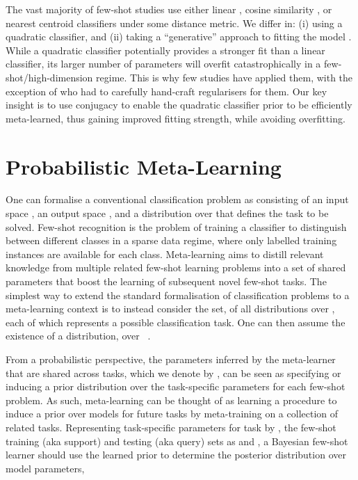 \documentclass[10pt,twocolumn,letterpaper]{article}
\begin{document}
 The vast majority of few-shot studies use either linear \cite{mangla2020charting,gordon2019metaPred,dvornik2020selecting}, cosine similarity \cite{qiao2017few}, or nearest centroid classifiers \cite{wang2019simpleshot,snell2017prototypical} under some distance metric. We differ in: (i) using a quadratic classifier, and (ii) taking a ``generative'' approach to fitting the model \cite{hastie2009elements}. While a quadratic classifier potentially provides a stronger fit than a linear classifier, its larger number of parameters will overfit catastrophically in a few-shot/high-dimension regime. This is why few studies have applied them, with the exception of \cite{bateni2020improved} who had to carefully hand-craft regularisers for them. Our key insight is to use conjugacy to enable the quadratic classifier prior to be efficiently meta-learned, thus gaining improved fitting strength, while avoiding overfitting.

\section{Probabilistic Meta-Learning}
\label{sec:probabilistic-meta-learning}
One can formalise a conventional classification problem as consisting of an input space , an output space , and a distribution  over  that defines the task to be solved. Few-shot recognition is the problem of training a classifier to distinguish between  different classes in a sparse data regime, where only  labelled training instances are available for each class. Meta-learning aims to distill relevant knowledge from multiple related few-shot learning problems into a set of shared parameters that boost the learning of subsequent novel few-shot tasks. The simplest way to extend the standard formalisation of classification problems to a meta-learning context is to instead consider the set,  of all distributions over , each of which represents a possible classification task. One can then assume the existence of a distribution,  over ~\cite{baxter2000model}.

From a probabilistic perspective, the parameters inferred by the meta-learner that are shared across tasks, which we denote by , can be seen as specifying or inducing a prior distribution over the task-specific parameters for each few-shot problem. As such, meta-learning can be thought of as learning a procedure to induce a prior over models for future tasks by meta-training on a collection of related tasks. Representing task-specific parameters for task  by , the few-shot training (aka support) and testing (aka query) sets as  and , a Bayesian few-shot learner should use the learned prior to determine the posterior distribution over model parameters,
\end{document}
